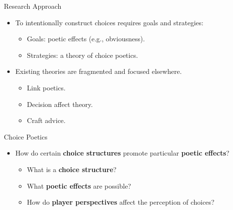 \documentclass[xcolor=x11names]{beamer}
\begin{document}
\begin{frame}{Research Approach}
  \begin{itemize}\addtolength{\itemsep}{0.5\baselineskip}
    \item To intentionally construct choices requires goals and strategies:%
    \begin{itemize}\addtolength{\itemsep}{0.5\baselineskip}
      \vspace{0.5\baselineskip}
      \item Goals: poetic effects (e.g., obviousness).
      \item Strategies: a theory of choice poetics.
    \end{itemize}
    \item Existing theories are fragmented and focused elsewhere.
    \begin{itemize}\addtolength{\itemsep}{0.5\baselineskip}
      \vspace{0.5\baselineskip}
      \item Link poetics.
      \item Decision affect theory.
      \item Craft advice.
    \end{itemize}
  \end{itemize}
\end{frame}

\begin{frame}{Choice Poetics}
  \vfill
  \begin{itemize}\addtolength{\itemsep}{0.5\baselineskip}
      \item How do certain \textbf{choice structures} promote particular \textbf{poetic effects}?
    \begin{itemize}\addtolength{\itemsep}{0.5\baselineskip}
      \vspace{0.5\baselineskip}
      \item What is a \textbf{choice structure}?
      \item What \textbf{poetic effects} are possible?
      \item How do \textbf{player perspectives} affect the perception of choices?
    \end{itemize}
  \end{itemize}
  \vfill
  \centering
  \tiny
\end{frame}
\end{document}
